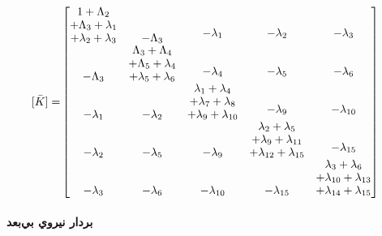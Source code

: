 \begin{equation}\label{Eq.stiffness_matrix_dimensionless}
\begin{aligned}
[\bar{K}] =& 
\begin{bmatrix}
\shortstack{$1 + \Lambda_2$ \\ $+ \Lambda_3 + \lambda_1$ \\ $+ \lambda_2 + \lambda_3$} & -\Lambda_3 & \shortstack{$-\lambda_1$ \\ \,} & \shortstack{$-\lambda_2$ \\ \,} & \shortstack{$-\lambda_3$ \\ \,} \\
-\Lambda_3 & \shortstack{$\Lambda_3 + \Lambda_4$ \\ $+ \Lambda_5 + \lambda_4$ \\ $+ \lambda_5 + \lambda_6$} & \shortstack{$-\lambda_4$ \\ \,} & \shortstack{$-\lambda_5$ \\ \,} & \shortstack{$-\lambda_6$ \\ \,} \\
-\lambda_1 & -\lambda_2 & \shortstack{$\lambda_1 + \lambda_4$ \\ $+ \lambda_7 + \lambda_8$ \\ $+ \lambda_9 + \lambda_{10}$} & \shortstack{$-\lambda_9$ \\ \,} & \shortstack{$-\lambda_{10}$ \\ \,} \\
-\lambda_2 & -\lambda_5 & -\lambda_9 & \shortstack{$\lambda_2 + \lambda_5$ \\ $+ \lambda_9 + \lambda_{11}$ \\ $+ \lambda_{12} + \lambda_{15}$} & \shortstack{$-\lambda_{15}$ \\ \,} \\
-\lambda_3 & -\lambda_{6} & -\lambda_{10} & -\lambda_{15} & \shortstack{$\lambda_3 + \lambda_6$ \\ $+ \lambda_{10} + \lambda_{13}$ \\ $+ \lambda_{14} + \lambda_{15}$}
\end{bmatrix}
\end{aligned}
\end{equation}

\paragraph{بردار نيروي بي‌بعد}

